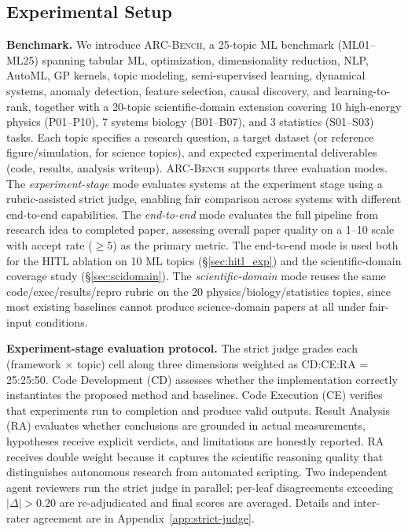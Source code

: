 \documentclass{llmxive}
\providecommand{\bench}{\textsc{ARC-Bench}}
\begin{document}
\subsection{Experimental Setup}
\label{sec:setup}
\vspace{-0.3em}

\noindent \textbf{Benchmark.} We introduce \bench, a 25-topic ML benchmark (\textsc{ML01}--\textsc{ML25}) spanning tabular ML, optimization, dimensionality reduction, NLP, AutoML, GP kernels, topic modeling, semi-supervised learning, dynamical systems, anomaly detection, feature selection, causal discovery, and learning-to-rank, together with a 20-topic scientific-domain extension covering 10 high-energy physics (\textsc{P01}--\textsc{P10}), 7 systems biology (\textsc{B01}--\textsc{B07}), and 3 statistics (\textsc{S01}--\textsc{S03}) tasks. Each topic specifies a research question, a target dataset (or reference figure/simulation, for science topics), and expected experimental deliverables (code, results, analysis writeup). \bench{} supports three evaluation modes. The \emph{experiment-stage} mode evaluates systems at the experiment stage using a rubric-assisted strict judge, enabling fair comparison across systems with different end-to-end capabilities. The \emph{end-to-end} mode evaluates the full pipeline from research idea to completed paper, assessing overall paper quality on a 1--10 scale with accept rate ($\geq 5$) as the primary metric. The end-to-end mode is used both for the HITL ablation on 10 \textsc{ML} topics (\S\ref{sec:hitl_exp}) and the scientific-domain coverage study (\S\ref{sec:scidomain}). The \emph{scientific-domain} mode reuses the same code/exec/results/repro rubric on the 20 physics/biology/statistics topics, since most existing baselines cannot produce science-domain papers at all under fair-input conditions.

\noindent \textbf{Experiment-stage evaluation protocol.} The strict judge grades each (framework $\times$ topic) cell along three dimensions weighted as CD:CE:RA = 25:25:50. Code Development (CD) assesses whether the implementation correctly instantiates the proposed method and baselines. Code Execution (CE) verifies that experiments run to completion and produce valid outputs. Result Analysis (RA) evaluates whether conclusions are grounded in actual measurements, hypotheses receive explicit verdicts, and limitations are honestly reported. RA receives double weight because it captures the scientific reasoning quality that distinguishes autonomous research from automated scripting. Two independent agent reviewers run the strict judge in parallel; per-leaf disagreements exceeding $|\Delta| > 0.20$ are re-adjudicated and final scores are averaged. Details and inter-rater agreement are in Appendix~\ref{app:strict-judge}.
\end{document}
